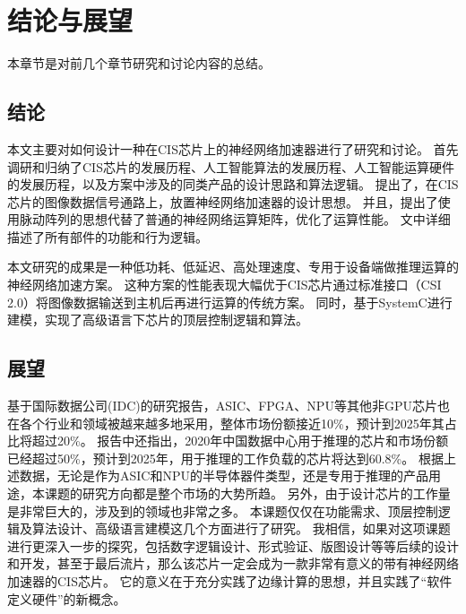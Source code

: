 
\chapter{结论与展望}

本章节是对前几个章节研究和讨论内容的总结。

\section{结论}

本文主要对如何设计一种在CIS芯片上的神经网络加速器进行了研究和讨论。
首先调研和归纳了CIS芯片的发展历程、人工智能算法的发展历程、人工智能运算硬件的发展历程，以及方案中涉及的同类产品的设计思路和算法逻辑。
提出了，在CIS芯片的图像数据信号通路上，放置神经网络加速器的设计思想。
并且，提出了使用脉动阵列的思想代替了普通的神经网络运算矩阵，优化了运算性能。
文中详细描述了所有部件的功能和行为逻辑。

本文研究的成果是一种低功耗、低延迟、高处理速度、专用于设备端做推理运算的神经网络加速方案。
这种方案的性能表现大幅优于CIS芯片通过标准接口（CSI 2.0）将图像数据输送到主机后再进行运算的传统方案。
同时，基于SystemC进行建模，实现了高级语言下芯片的顶层控制逻辑和算法。



\section{展望}
基于国际数据公司(IDC)的研究报告，ASIC、FPGA、NPU等其他非GPU芯片也在各个行业和领域被越来越多地采用，整体市场份额接近10\%，预计到2025年其占比将超过20\%。
报告中还指出，2020年中国数据中心用于推理的芯片和市场份额已经超过50\%，预计到2025年，用于推理的工作负载的芯片将达到60.8\%。
根据上述数据，无论是作为ASIC和NPU的半导体器件类型，还是专用于推理的产品用途，本课题的研究方向都是整个市场的大势所趋。
另外，由于设计芯片的工作量是非常巨大的，涉及到的领域也非常之多。
本课题仅仅在功能需求、顶层控制逻辑及算法设计、高级语言建模这几个方面进行了研究。
我相信，如果对这项课题进行更深入一步的探究，包括数字逻辑设计、形式验证、版图设计等等后续的设计和开发，甚至于最后流片，那么该芯片一定会成为一款非常有意义的带有神经网络加速器的CIS芯片。
它的意义在于充分实践了边缘计算的思想，并且实践了“软件定义硬件”的新概念。

